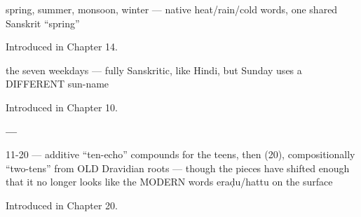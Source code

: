 \noindent\begin{minipage}[t]{\linewidth}
\raggedright
\textbf{    }\par
\small spring, summer, monsoon, winter — native heat/rain/cold words, one shared Sanskrit \textquotedblleft{}spring\textquotedblright{}\par
\footnotesize Introduced in Chapter 14.
\end{minipage}\par\medskip

\noindent\begin{minipage}[t]{\linewidth}
\raggedright
\textbf{      }\par
\small the seven weekdays — fully Sanskritic, like Hindi, but Sunday uses a DIFFERENT sun-name\par
\footnotesize Introduced in Chapter 10.
\end{minipage}\par\medskip

\noindent\begin{minipage}[t]{\linewidth}
\raggedright
\textbf{ — }\par
\small 11-20 — additive \textquotedblleft{}ten-echo\textquotedblright{} compounds for the teens, then  (20), compositionally \textquotedblleft{}two-tens\textquotedblright{} from OLD Dravidian roots — though the pieces have shifted enough that it no longer looks like the MODERN words eraḍu/hattu on the surface\par
\footnotesize Introduced in Chapter 20.
\end{minipage}\par\medskip
